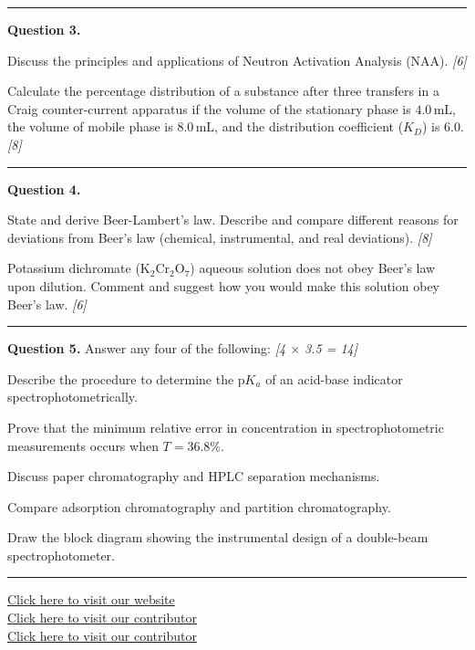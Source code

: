 \documentclass[11pt,a4paper]{article}
\newcommand{\pts}[1]{\hfill   \textit{[#1]}}
\begin{document}
\medskip\rule{\linewidth}{0.2pt}




\noindent   \textbf{Question 3.}

\begin{parts}
  \item Discuss the principles and applications of Neutron Activation Analysis (NAA). \pts{6}
  \item Calculate the percentage distribution of a substance after three transfers in a Craig counter-current apparatus if the volume of the stationary phase is $4.0\, \text{mL}$, the volume of mobile phase is $8.0\, \text{mL}$, and the distribution coefficient ($K_D$) is $6.0$. \pts{8}
\end{parts}

\medskip\rule{\linewidth}{0.2pt}




\noindent   \textbf{Question 4.}

\begin{parts}
  \item State and derive Beer-Lambert's law. Describe and compare different reasons for deviations from Beer's law (chemical, instrumental, and real deviations). \pts{8}
  \item Potassium dichromate ($ \text{K}_2 \text{Cr}_2 \text{O}_7$) aqueous solution does not obey Beer's law upon dilution. Comment and suggest how you would make this solution obey Beer's law. \pts{6}
\end{parts}

\medskip\rule{\linewidth}{0.2pt}




\noindent   \textbf{Question 5.} Answer any four of the following: \pts{4 $ \times$ 3.5 = 14}

\begin{parts}
  \item Describe the procedure to determine the $ \text{p}K_a$ of an acid-base indicator spectrophotometrically.
  \item Prove that the minimum relative error in concentration in spectrophotometric measurements occurs when $T = 36.8\%$.
  \item Discuss paper chromatography and HPLC separation mechanisms.
  \item Compare adsorption chromatography and partition chromatography.
  \item Draw the block diagram showing the instrumental design of a double-beam spectrophotometer.
\end{parts}

\vfill
\rule{\linewidth}{0.4pt}

\begin{center}\small
  \href{https://bhu-exam.vercel.app/}{Click here to visit our website}\\[4pt]
  \href{https://me-aryan.vercel.app/}{Click here to visit our contributor}\\[4pt]
  \href{https://quashan-me.vercel.app/}{Click here to visit our contributor}
\end{center}
\end{document}
